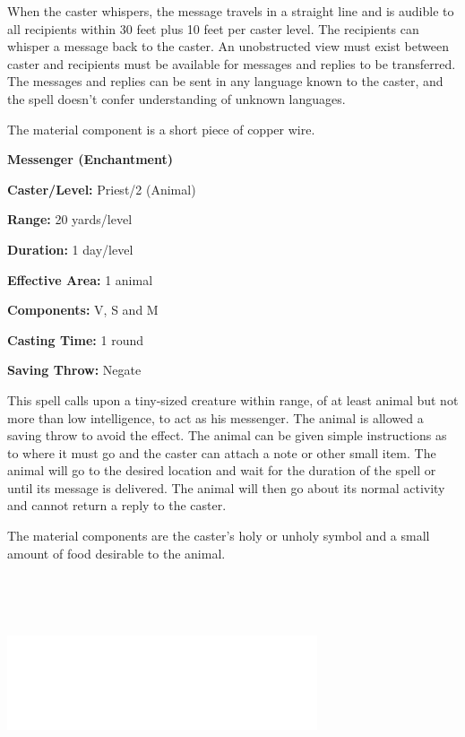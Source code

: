 \begin{multicols}{2}
When the caster whispers, the message travels in a straight line and is audible to all recipients within 30 feet plus 10 feet per caster level.  The recipients can whisper a message back to the caster.  An unobstructed view must exist between caster and recipients must be available for messages and replies to be transferred.  The messages and replies can be sent in any language known to the caster, and the spell doesn't confer understanding of unknown languages.

The material component is a short piece of copper wire.

\vspace{1em}

\noindent
\begin{minipage}{\columnwidth}

\noindent \textbf{Messenger (Enchantment)}

\noindent \textbf{Caster/Level:} Priest/2 (Animal)

\noindent \textbf{Range:} 20 yards/level

\noindent \textbf{Duration:} 1 day/level

\noindent \textbf{Effective Area:} 1 animal

\noindent \textbf{Components:} V, S and M

\noindent \textbf{Casting Time:} 1 round

\noindent \textbf{Saving Throw:} Negate

\end{minipage}

This spell calls upon a tiny-sized creature within range, of at least animal but not more than low intelligence, to act as his messenger.  The animal is allowed a saving throw to avoid the effect.  The animal can be given simple instructions as to where it must go and the caster can attach a note or other small item.  The animal will go to the desired location and wait for the duration of the spell or until its message is delivered.  The animal will then go about its normal activity and cannot return a reply to the caster.

The material components are the caster's holy or unholy symbol and a small amount of food desirable to the animal.

\noindent\includegraphics[width=3.6in, height=2.5in]{testblock.pdf}


\end{multicols}
